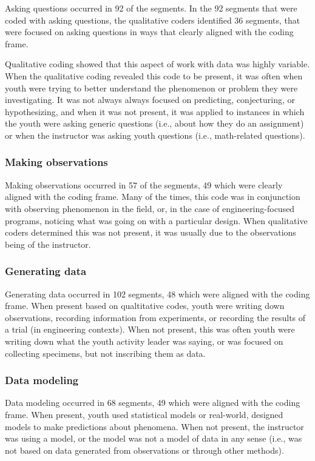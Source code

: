 \documentclass[]{msu-thesis}
\theoremstyle{definition}
\theoremstyle{definition}
\theoremstyle{definition}
\theoremstyle{remark}
\begin{document}
Asking questions occurred in 92 of the segments. In the 92 segments that
were coded with asking questions, the qualitative coders identified 36
segments, that were focused on asking questions in ways that clearly
aligned with the coding frame.

Qualitative coding showed that this aspect of work with data was highly
variable. When the qualitative coding revealed this code to be present,
it was often when youth were trying to better understand the phenomenon
or problem they were investigating. It was not always always focused on
predicting, conjecturing, or hypothesizing, and when it was not present,
it was applied to instances in which the youth were asking generic
questions (i.e., about how they do an assignment) or when the instructor
was asking youth questions (i.e., math-related questions).

\subsubsection{Making observations}\label{making-observations}

Making observations occurred in 57 of the segments, 49 which were
clearly aligned with the coding frame. Many of the times, this code was
in conjunction with observing phenomenon in the field, or, in the case
of engineering-focused programs, noticing what was going on with a
particular design. When qualitative coders determined this was not
present, it was usually due to the observations being of the instructor.

\subsubsection{Generating data}\label{generating-data}

Generating data occurred in 102 segments, 48 which were aligned with the
coding frame. When present based on qualtitative codes, youth were
writing down observations, recording information from experiments, or
recording the results of a trial (in engineering contexts). When not
present, this was often youth were writing down what the youth activity
leader was saying, or was focused on collecting specimens, but not
inscribing them as data.

\subsubsection{Data modeling}\label{data-modeling}

Data modeling occurred in 68 segments, 49 which were aligned with the
coding frame. When present, youth used statistical models or real-world,
designed models to make predictions about phenomena. When not present,
the instructor was using a model, or the model was not a model of data
in any sense (i.e., was not based on data generated from observations or
through other methods).
\end{document}
